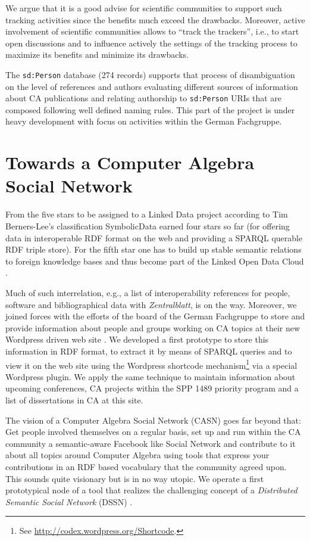 \documentclass{llncs}
\newcommand{\SD}{{\sc Symbolic\-Data}}
\begin{document}
We argue that it is a good advise for scientific communities to support such
tracking activities since the benefits much exceed the drawbacks.  Moreover,
active involvement of scientific communities allows to ``track the trackers'',
i.e., to start open discussions and to influence actively the settings of the
tracking process to maximize its benefits and minimize its drawbacks.

The \texttt{sd:Person} database (274 records) supports that process of
disambiguation on the level of references and authors evaluating different
sources of information about CA publications and relating authorship to
\texttt{sd:Person} URIs that are composed following well defined naming rules.
This part of the project is under heavy development with focus on activities
within the German Fachgruppe.

\section{Towards a Computer Algebra Social Network}

From the five stars to be assigned to a Linked Data project according to Tim
Berners-Lee's classification \cite{5stars} {\SD} earned four stars so far (for
offering data in interoperable RDF format on the web and providing a SPARQL
querable RDF triple store).  For the fifth star one has to build up stable
semantic relations to foreign knowledge bases and thus become part of the
Linked Open Data Cloud \cite{lod}.

Much of such interrelation, e.g., a list of interoperability references for
people, software and bibliographical data with \emph{Zentralblatt}, is on the
way.  Moreover, we joined forces with the efforts of the board of the German
Fachgruppe to store and provide information about people and groups working on
CA topics at their new Wordpress driven web site \cite{cafg}.  We developed a
first prototype to store this information in RDF format, to extract it by
means of SPARQL queries and to view it on the web site using the Wordpress
shortcode mechanism\footnote{See \url{http://codex.wordpress.org/Shortcode}.}
via a special Wordpress plugin.  We apply the same technique to maintain
information about upcoming conferences, CA projects within the SPP 1489
priority program and a list of dissertations in CA at this site.

The vision of a Computer Algebra Social Network (CASN) goes far beyond that:
Get people involved themselves on a regular basis, set up and run within the
CA community a semantic-aware Facebook like Social Network and contribute to
it about all topics around Computer Algebra using tools that express your
contributions in an RDF based vocabulary that the community agreed upon. This
sounds quite visionary but is in no way utopic. We operate a first
prototypical node of a tool that realizes the challenging concept of a
\emph{Distributed Semantic Social Network} (DSSN) \cite{dssn}.
\end{document}
